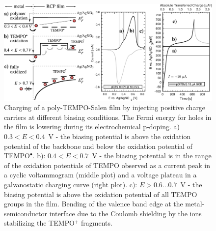 \begin{figure}[h]
\center
	\includegraphics[width=1\textwidth]{./electrochemistry/figures/transport_in_film.pdf}
	\caption{Charging of a poly-TEMPO-Salen film by injecting positive charge carriers at different biasing conditions. The Fermi energy for holes in the film is lowering during its electrochemical p-doping. a) $0.3<E<0.4$~V - the biasing potential is above the oxidation potential of the backbone and below the oxidation potential of TEMPO$^{\bullet}$. b): $0.4<E<0.7$~V - the biasing potential is in the range of the oxidation potentials of TEMPO observed as a current peak in a cyclic voltammogram (middle plot) and a voltage plateau in a galvanostatic charging curve (right plot). c): $E>0.6...0.7$~V - the biasing potential is above the oxidation potential of all TEMPO groups in the film. Bending of the valence band edge at the metal-semiconductor interface due to the Coulomb shielding by the ions stabilizing the TEMPO$^+$ fragments.}
	\label{fig:biasing_charging}
\end{figure}
